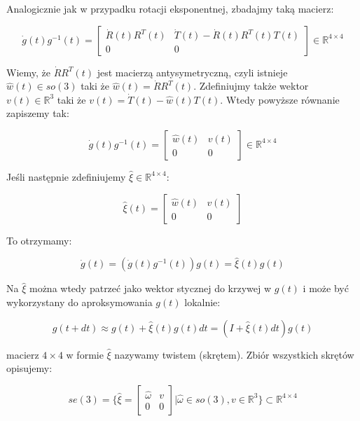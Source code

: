 \documentclass[a4paper,12pt]{article}
\newcommand{\RR}{\mathbb{R}^3}
\newcommand{\RRRq}{\mathbb{R}^{4 \times 4}}
\begin{document}
Analogicznie jak w przypadku rotacji eksponentnej, zbadajmy taką macierz:

\begin{equation}
\dot{g}(t)g^{-1}(t) = \begin{bmatrix} \dot{R}(t)R^T(t) & \dot{T}(t) - \dot{R}(t)R^T(t)T(t) \\ 0 & 0 \end{bmatrix} \in \RRRq
\end{equation}

Wiemy, że $\dot{R}R^T(t)$ jest macierzą antysymetryczną, czyli istnieje $\hat{w}(t) \in so(3)$ taki że $\hat{w}(t)=\dot{R}R^T(t)$. Zdefiniujmy także wektor $v(t) \in \RR$ taki że $v(t) = \dot{T}(t) - \hat{w}(t)T(t)$. Wtedy powyższe równanie zapiszemy tak:

\begin{equation}
\dot{g}(t)g^{-1}(t) = \begin{bmatrix} \hat{w}(t) & v(t) \\ 0 & 0 \end{bmatrix} \in \RRRq
\end{equation}

\noindent Jeśli następnie zdefiniujemy $\hat{\xi} \in \RRRq$:

\begin{equation}
\hat{\xi}(t) = \begin{bmatrix} \hat{w}(t) & v(t) \\ 0 & 0 \end{bmatrix}
\end{equation}

\noindent To otrzymamy:

\begin{equation}
\dot{g}(t)=(\dot{g}(t)g^{-1}(t))g(t)=\hat{\xi}(t)g(t)
\end{equation}

Na $\hat{\xi}$ można wtedy patrzeć jako wektor stycznej do krzywej w $g(t)$ i może być wykorzystany do aproksymowania $g(t)$ lokalnie:

\begin{equation}
g(t + dt) \approx g(t) + \hat{\xi}(t)g(t)dt = (I + \hat{\xi}(t)dt)g(t)
\end{equation}

macierz $4 \times 4$ w formie $\hat{\xi}$ nazywamy twistem (skrętem). Zbiór wszystkich skrętów opisujemy:

\begin{equation}
se(3)= \{ \hat{\xi}=\begin{bmatrix} \hat{\omega} & v \\ 0 & 0 \end{bmatrix} | \hat{\omega} \in so(3), v \in \RR \} \subset \RRRq
\end{equation}
\end{document}
